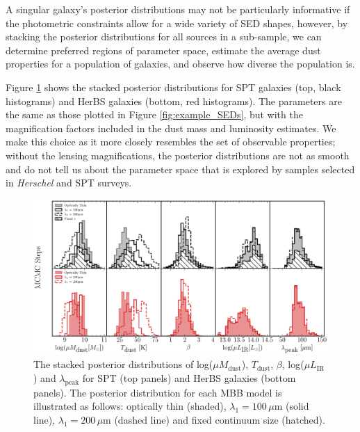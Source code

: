 A singular galaxy's posterior distributions may not be particularly informative if the photometric constraints allow for a wide variety of SED shapes, however, by stacking the posterior distributions for all sources in a sub-sample, we can determine preferred regions of parameter space, estimate the average dust properties for a population of galaxies, and observe how diverse the population is. 

Figure \ref{fig:stacked_posteriors} shows the stacked posterior distributions for SPT galaxies (top, black histograms) and HerBS galaxies (bottom, red histograms). The parameters are the same as those plotted in Figure \ref{fig:example_SEDs}, but with the magnification factors included in the dust mass and luminosity estimates. We make this choice as it more closely resembles the set of observable properties; without the lensing magnifications, the posterior distributions are not as smooth and do not tell us about the parameter space that is explored by samples selected in \textit{Herschel} and SPT surveys.

\begin{figure}
	\centering
	\includegraphics[width=\columnwidth]{Figures/stacked_posterior.pdf}
	\caption[Stacked posterior distributions for each MBB model]{The stacked posterior distributions of log($\mu M_{\textrm{dust}}$), $T_{\textrm{dust}}$, $\beta$, log($\mu L_{\textrm{IR}}$) and $\lambda_{\textrm{peak}}$ for SPT (top panels) and HerBS galaxies (bottom panels). The posterior distribution for each MBB model is illustrated as follows: optically thin (shaded), $\lambda_1 = 100\,\mu$m (solid line), $\lambda_1 = 200\,\mu$m (dashed line) and fixed continuum size (hatched).}
	\label{fig:stacked_posteriors}
\end{figure}

